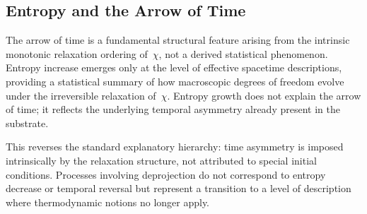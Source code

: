 \subsection{Entropy and the Arrow of Time}
\label{subsec:entropy-arrow}

The arrow of time is a fundamental structural feature arising from the
intrinsic monotonic relaxation ordering of~$\chi$, not a derived
statistical phenomenon.
Entropy increase emerges only at the level of effective spacetime
descriptions, providing a statistical summary of how macroscopic degrees
of freedom evolve under the irreversible relaxation of~$\chi$.
Entropy growth does not explain the arrow of time; it reflects the
underlying temporal asymmetry already present in the substrate.

This reverses the standard explanatory hierarchy: time asymmetry is
imposed intrinsically by the relaxation structure, not attributed to
special initial conditions.
Processes involving deprojection do not correspond to entropy decrease or
temporal reversal but represent a transition to a level of description
where thermodynamic notions no longer apply.
